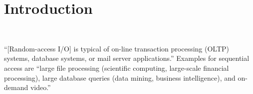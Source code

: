 \chapter{Introduction}
\label{chap:introduction}

\\

 ``[Random-access I/O] is typical of on-line transaction processing (OLTP) systems, database systems, or mail server applications.'' Examples for sequential access are ``large file processing (scientific computing, large-scale financial processing), large database queries (data mining, business intelligence), and on-demand video.''